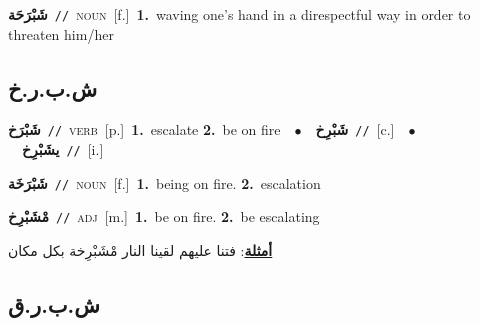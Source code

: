\documentclass[10pt,a4paper,twoside]{article} %
\begin{document}
\begin{multicols}{2}
{\setlength\topsep{0pt}\textbf{\foreignlanguage{arabic}{شَبْرَحَة}}\ {\color{gray}\texttt{//}\color{black}}\ \textsc{noun}\ [f.]\ \textbf{1.}~waving one's hand in a direspectful way in order to threaten him/her\ } \vspace{2mm}

\vspace{-3mm}
\subsection*{\color{blue}\foreignlanguage{arabic}{ش.ب.ر.خ}\color{blue}{}} 

{\setlength\topsep{0pt}\textbf{\foreignlanguage{arabic}{شَبْرَخ}}\ {\color{gray}\texttt{//}\color{black}}\ \textsc{verb}\ [p.]\ \textbf{1.}~escalate  \textbf{2.}~be on fire\ \ $\bullet$\ \ \setlength\topsep{0pt}\textbf{\foreignlanguage{arabic}{شَبْرِخ}}\ {\color{gray}\texttt{//}\color{black}}\ [c.]\ \ $\bullet$\ \ \setlength\topsep{0pt}\textbf{\foreignlanguage{arabic}{يشَبْرِخ}}\ {\color{gray}\texttt{//}\color{black}}\ [i.]\ } \vspace{2mm}

{\setlength\topsep{0pt}\textbf{\foreignlanguage{arabic}{شَبْرَخَة}}\ {\color{gray}\texttt{//}\color{black}}\ \textsc{noun}\ [f.]\ \textbf{1.}~being on fire.  \textbf{2.}~escalation\ } \vspace{2mm}

{\setlength\topsep{0pt}\textbf{\foreignlanguage{arabic}{مْشَبْرِخ}}\ {\color{gray}\texttt{//}\color{black}}\ \textsc{adj}\ [m.]\ \textbf{1.}~be on fire.  \textbf{2.}~be escalating\  \begin{flushright}\color{gray}\foreignlanguage{arabic}{\textbf{\underline{\foreignlanguage{arabic}{أمثلة}}}: فتنا عليهم لقينا النار مْشَبْرِخة بكل مكان}\end{flushright}\color{black}} \vspace{2mm}

\vspace{-3mm}
\subsection*{\color{blue}\foreignlanguage{arabic}{ش.ب.ر.ق}\color{blue}{}} 


\end{multicols}
\end{document}
